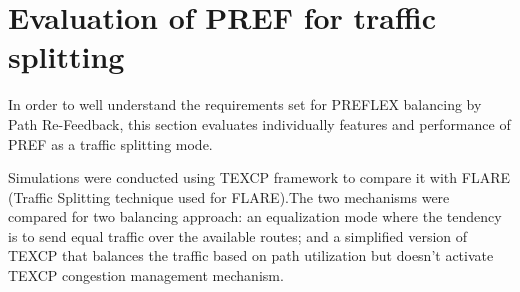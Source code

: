 \section{Evaluation of PREF for traffic splitting}

In order to well understand the requirements set for PREFLEX balancing by Path Re-Feedback, this section evaluates individually features and performance of PREF as a traffic splitting mode.  

Simulations were conducted using TEXCP framework to compare it with FLARE (Traffic Splitting technique used for FLARE).The two mechanisms were compared for two balancing approach: an equalization mode where the tendency is to send equal traffic over the available routes; and a simplified  version of TEXCP that balances the traffic based on path utilization but doesn't activate TEXCP congestion management mechanism.
 
